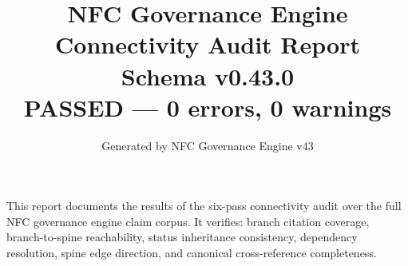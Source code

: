 \documentclass[11pt]{article}
\title{NFC Governance Engine\\[1ex]
Connectivity Audit Report\\[1ex]\large Schema v0.43.0\\[0.5ex]
\normalsize PASSED --- 0 errors, 0 warnings}
\author{Generated by NFC Governance Engine v43}
\date{}
\begin{document}
\maketitle
\tableofcontents
\bigskip
\noindent This report documents the results of the six-pass connectivity audit
over the full NFC governance engine claim corpus.
It verifies: branch citation coverage, branch-to-spine reachability,
status inheritance consistency, dependency resolution, spine edge direction,
and canonical cross-reference completeness.
\vspace{1em}

\end{document}
